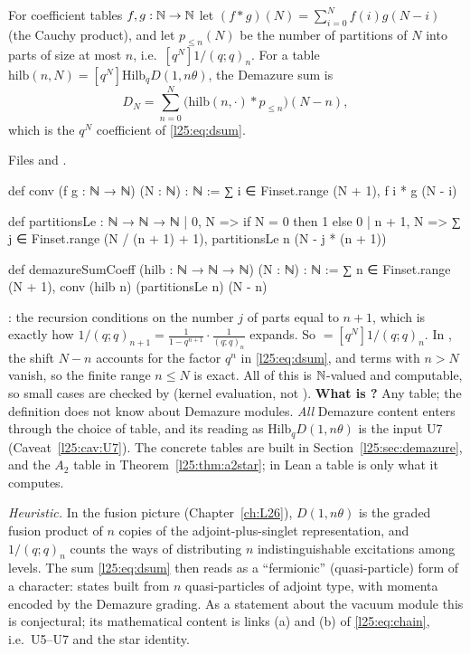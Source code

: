 \begin{definition}\label{l25:def:dsum}
For coefficient tables $f,g:{\mathbb{N}}\to{\mathbb{N}}$ let $(f\ast g)(N)=\sum_{i=0}^Nf(i)g(N-i)$ (the Cauchy product), and let
$p_{\le n}(N)$ be the number of partitions of $N$ into parts of size at most $n$, i.e.\ $[q^N]1/(q;q)_n$. For a
table $\mathrm{hilb}(n,N)=[q^N]\mathrm{Hilb}_qD(1,n\theta)$, the Demazure sum is
\begin{equation*}
D_N=\sum_{n=0}^{N}\big(\mathrm{hilb}(n,\cdot)\ast p_{\le n}\big)(N-n),
\end{equation*}
which is the $q^N$ coefficient of \eqref{l25:eq:dsum}.
\end{definition}
\noindent Files  and
.
\begin{leancode}
def conv (f g : ℕ → ℕ) (N : ℕ) : ℕ :=
  ∑ i ∈ Finset.range (N + 1), f i * g (N - i)

def partitionsLe : ℕ → ℕ → ℕ
  | 0, N => if N = 0 then 1 else 0
  | n + 1, N => ∑ j ∈ Finset.range (N / (n + 1) + 1), partitionsLe n (N - j * (n + 1))

def demazureSumCoeff (hilb : ℕ → ℕ → ℕ) (N : ℕ) : ℕ :=
  ∑ n ∈ Finset.range (N + 1), conv (hilb n) (partitionsLe n) (N - n)
\end{leancode}
\begin{dictionary}
: the recursion conditions on the number $j$ of parts equal to $n+1$, which is
exactly how $1/(q;q)_{n+1}=\frac{1}{1-q^{n+1}}\cdot\frac{1}{(q;q)_n}$ expands. So
 $=[q^N]1/(q;q)_n$. In , the shift $N-n$ accounts for the
factor $q^n$ in \eqref{l25:eq:dsum}, and terms with $n>N$ vanish, so the finite range $n\le N$ is exact. All of
this is ${\mathbb{N}}$-valued and computable, so small cases are checked by  (kernel evaluation,
not ). \textbf{What is ?} Any table; the definition does not know about
Demazure modules. \emph{All} Demazure content enters through the choice of table, and its reading as
$\mathrm{Hilb}_qD(1,n\theta)$ is the input U7 (Caveat~\ref{l25:cav:U7}). The concrete tables are built in
Section~\ref{l25:sec:demazure}, and the $A_2$ table in Theorem~\ref{l25:thm:a2star}; in Lean a table is only what it
computes.
\end{dictionary}
\begin{physics}
\emph{Heuristic.} In the fusion picture (Chapter~\ref{ch:L26}), $D(1,n\theta)$ is the graded fusion product of $n$
copies of the adjoint-plus-singlet representation, and $1/(q;q)_n$ counts the ways of distributing $n$
indistinguishable excitations among levels. The sum \eqref{l25:eq:dsum} then reads as a ``fermionic''
(quasi-particle) form of a character: states built from $n$ quasi-particles of adjoint type, with momenta encoded by
the Demazure grading. As a statement about the vacuum module this is conjectural; its mathematical content is links
(a) and (b) of \eqref{l25:eq:chain}, i.e.\ U5--U7 and the star identity.
\end{physics}
